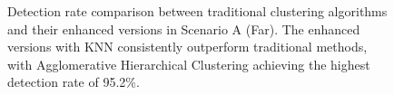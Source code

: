 \begin{figure}[htbp]
    \caption{Detection rate comparison between traditional clustering algorithms and their enhanced versions in Scenario A (Far). The enhanced versions with KNN consistently outperform traditional methods, with Agglomerative Hierarchical Clustering achieving the highest detection rate of 95.2\%.}
    \label{fig:detection_comparison_A_enhanced}
\end{figure}

